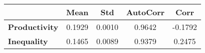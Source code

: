 \begin{tiny}\begin{tabular}{|l|c|c|c|c|}
\hline
&\textbf{Mean}&\textbf{Std}&\textbf{AutoCorr}&\textbf{Corr}\\\hline
\textbf{Productivity}&0.1929&0.0010&0.9642&-0.1792\\\hline
\textbf{Inequality}&0.1465&0.0089&0.9379&0.2475\\\hline
\end{tabular}
\end{tiny}